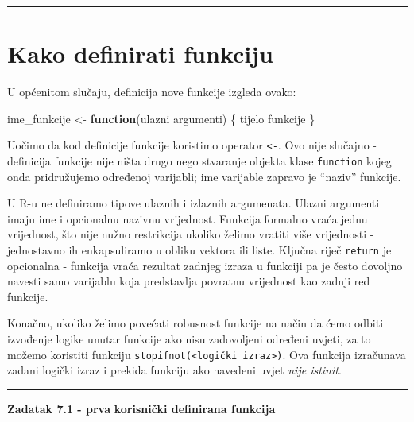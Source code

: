\documentclass[]{book}
\newenvironment{Shaded}{\begin{snugshade}}{\end{snugshade}}
\newcommand{\StringTok}[1]{\textcolor[rgb]{0.31,0.60,0.02}{#1}}
\newcommand{\ControlFlowTok}[1]{\textcolor[rgb]{0.13,0.29,0.53}{\textbf{#1}}}
\newcommand{\NormalTok}[1]{#1}
\theoremstyle{definition}
\theoremstyle{definition}
\theoremstyle{definition}
\theoremstyle{remark}
\begin{document}
\begin{center}\rule{0.5\linewidth}{\linethickness}\end{center}

\section{Kako definirati funkciju}\label{kako-definirati-funkciju}

U općenitom slučaju, definicija nove funkcije izgleda ovako:

\begin{Shaded}
\begin{Highlighting}[]
\NormalTok{ime_funkcije <-}\StringTok{ }\ControlFlowTok{function}\NormalTok{(ulazni argumenti) \{}
\NormalTok{    tijelo funkcije}
\NormalTok{\}}
\end{Highlighting}
\end{Shaded}

Uočimo da kod definicije funkcije koristimo operator
\texttt{\textless{}-}. Ovo nije slučajno - definicija funkcije nije
ništa drugo nego stvaranje objekta klase \texttt{function} kojeg onda
pridružujemo određenoj varijabli; ime varijable zapravo je ``naziv''
funkcije.

U R-u ne definiramo tipove ulaznih i izlaznih argumenata. Ulazni
argumenti imaju ime i opcionalnu nazivnu vrijednost. Funkcija formalno
vraća jednu vrijednost, što nije nužno restrikcija ukoliko želimo
vratiti više vrijednosti - jednostavno ih enkapsuliramo u obliku vektora
ili liste. Ključna riječ \texttt{return} je opcionalna - funkcija vraća
rezultat zadnjeg izraza u funkciji pa je često dovoljno navesti samo
varijablu koja predstavlja povratnu vrijednost kao zadnji red funkcije.

Konačno, ukoliko želimo povećati robusnost funkcije na način da ćemo
odbiti izvođenje logike unutar funkcije ako nisu zadovoljeni određeni
uvjeti, za to možemo koristiti funkciju
\texttt{stopifnot(\textless{}logički\ izraz\textgreater{})}. Ova
funkcija izračunava zadani logički izraz i prekida funkciju ako navedeni
uvjet \emph{nije istinit}.

\begin{center}\rule{0.5\linewidth}{\linethickness}\end{center}

\textbf{Zadatak 7.1 - prva } \textbf{korisnički definirana funkcija}
\end{document}
